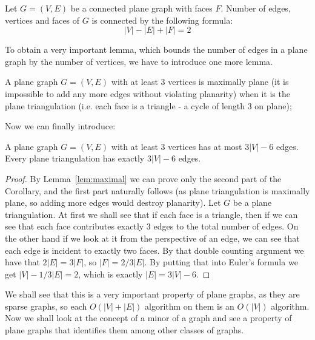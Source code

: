 \begin{theorem}  \label{thm:euler}
    Let $G = (V, E)$ be a connected plane graph with faces $F$. Number of edges, vertices and faces of $G$
    is connected by the following formula:
    \begin{equation*}
        |V| - |E| + |F| = 2
    \end{equation*}
\end{theorem}

To obtain a very important lemma, which bounds the number of edges in a plane graph by the number of vertices, we have to introduce
one more lemma.

\begin{lemma}  \label{lem:maximal}
    A plane graph $G = (V, E)$ with at least 3 vertices is maximally plane (it is impossible to add any more edges without violating
    planarity) when it is the plane triangulation (i.e. each face is a triangle - a cycle of length 3 on plane);
\end{lemma}

Now we can finally introduce:
\begin{corollary}  \label{corollary:planar-bound}
    A plane graph $G = (V, E)$ with at least 3 vertices has at most $3 |V| - 6$ edges. Every plane triangulation has exactly $3 |V| - 6$
    edges.
\end{corollary}

\begin{proof}
    By Lemma~\ref{lem:maximal} we can prove only the second part of the Corollary, and the first part naturally follows (as plane triangulation
    is maximally plane, so adding more edges would destroy planarity). Let $G$ be a 
    plane triangulation. At first we shall see that if each face is a triangle, then if we can see that each face contributes exactly 3
    edges to the total number of edges. On the other hand if we look at it from the perspective of an edge, we can see that each edge is 
    incident to exactly two faces. By that double counting argument we have that $2 |E| = 3 | F |$, so $|F| = 2/3 |E|$. By putting that
    into Euler's formula we get $|V| - 1/3 |E| = 2$, which is exactly $|E| = 3 |V| - 6$.
\end{proof}

We shall see that this is a very important property of plane graphs, as they are sparse graphs, so each $O(|V| + |E|)$ algorithm on 
them is an $O(|V|)$ algorithm. Now we shall look at the concept of a minor of a graph and see a property of plane graphs that identifies
them among other classes of graphs.

